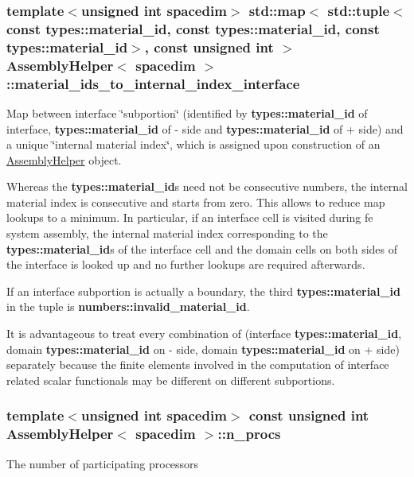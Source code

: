 \subsubsection[{\texorpdfstring{material\+\_\+ids\+\_\+to\+\_\+internal\+\_\+index\+\_\+interface}{material_ids_to_internal_index_interface}}]{\setlength{\rightskip}{0pt plus 5cm}template$<$unsigned int spacedim$>$ std\+::map$<$ std\+::tuple$<$ const {\bf types\+::material\+\_\+id}, const {\bf types\+::material\+\_\+id}, const {\bf types\+::material\+\_\+id}$>$, const unsigned int $>$ {\bf Assembly\+Helper}$<$ spacedim $>$\+::material\+\_\+ids\+\_\+to\+\_\+internal\+\_\+index\+\_\+interface\hspace{0.3cm}{\ttfamily [private]}}\hypertarget{class_assembly_helper_a43b82de0ede96d03b9f7fd8740d81668}{}\label{class_assembly_helper_a43b82de0ede96d03b9f7fd8740d81668}
Map between interface \char`\"{}subportion\char`\"{} (identified by {\bf types\+::material\+\_\+id} of interface, {\bf types\+::material\+\_\+id} of -\/ side and {\bf types\+::material\+\_\+id} of + side) and a unique \char`\"{}internal material index\char`\"{}, which is assigned upon construction of an \hyperlink{class_assembly_helper}{Assembly\+Helper} object.

Whereas the {\bf types\+::material\+\_\+id}s need not be consecutive numbers, the internal material index is consecutive and starts from zero. This allows to reduce map lookups to a minimum. In particular, if an interface cell is visited during fe system assembly, the internal material index corresponding to the {\bf types\+::material\+\_\+id}s of the interface cell and the domain cells on both sides of the interface is looked up and no further lookups are required afterwards.

If an interface subportion is actually a boundary, the third {\bf types\+::material\+\_\+id} in the tuple is {\bf numbers\+::invalid\+\_\+material\+\_\+id}.

It is advantageous to treat every combination of (interface {\bf types\+::material\+\_\+id}, domain {\bf types\+::material\+\_\+id} on -\/ side, domain {\bf types\+::material\+\_\+id} on + side) separately because the finite elements involved in the computation of interface related scalar functionals may be different on different subportions. 
\subsubsection[{\texorpdfstring{n\+\_\+procs}{n_procs}}]{\setlength{\rightskip}{0pt plus 5cm}template$<$unsigned int spacedim$>$ const unsigned int {\bf Assembly\+Helper}$<$ spacedim $>$\+::n\+\_\+procs\hspace{0.3cm}{\ttfamily [private]}}\hypertarget{class_assembly_helper_a87945d87baf37637673fd124b3803fd5}{}\label{class_assembly_helper_a87945d87baf37637673fd124b3803fd5}
The number of participating processors 
